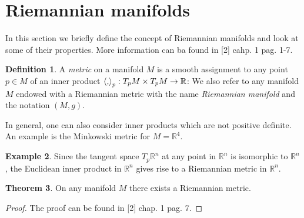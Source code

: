 \documentclass[12pt,a4paper]{report}
\theoremstyle{definition}
\newtheorem{Def}{Definition}[chapter]
\theoremstyle{Theorem}
\newtheorem{Theo}[Def]{Theorem}
\theoremstyle{definition}
\newtheorem{Ex}[Def]{Example}
\theoremstyle{definition}
\begin{document}
	\section{Riemannian manifolds}
	In this section we briefly define the concept of Riemannian manifolds and look at some of their properties. More information can ba found in [2] cahp. 1 pag. 1-7.
	\begin{Def}
		A \textit{metric} on a manifold $M$ is a smooth assignment to any point $p\in M$ of an inner product $\braket{,}_p:T_pM\times T_pM\rightarrow \mathbb{R}$:
		We also refer to any manifold $M$ endowed with a Riemannian metric with the name \textit{Riemannian manifold} and the notation $(M,g)$.
	\end{Def}
	In general, one can also consider inner products which are not positive definite. An example is the Minkowski metric for $M=\mathbb{R}^4$.
	\begin{Ex}
		Since the tangent space $T_p\mathbb{R}^n$ at any point in $\mathbb{R}^n$ is isomorphic to $\mathbb{R}^n$, the Euclidean inner product in $\mathbb{R}^n$ gives rise to a Riemannian metric in $\mathbb{R}^n$.		
	\end{Ex}
	\begin{Theo}
		On any manifold $M$ there exists a Riemannian metric.
	\end{Theo}
	\begin{proof}
		The proof can be found in [2] chap. 1 pag. 7.
	\end{proof}
\end{document}
